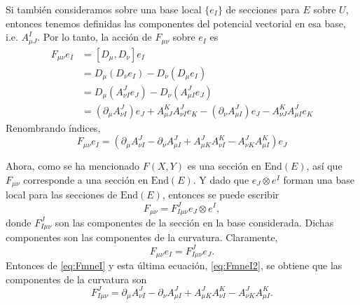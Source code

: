 Si tambi\'{e}n consideramos sobre una base local $\{e_{I}\}$ de secciones para $E$ sobre $U$, entonces tenemos definidas las componentes del potencial vectorial en esa base, i.e. $A^{I}_{\mu J}$. Por lo tanto, la acci\'{o}n de $F_{\mu \nu}$ sobre $e_{I}$ es
%
\begin{align*}
F_{\mu \nu} e_{I} & = [D_{\mu}, D_{\nu}] e_{I} \\
& = D_{\mu} (D_{\nu} e_{I}) - D_{\nu} (D_{\mu} e_{I}) \\
& = D_{\mu} (A^{J}_{\nu I} e_{J}) - D_{\nu} (A^{J}_{\mu I} e_{J}) \\
& = (\partial_{\mu} A^{J}_{\nu I}) e_{J} + A^{K}_{\mu J} A^{J}_{\nu I} e_{K} - (\partial_{\nu} A^{J}_{\mu I}) e_{J} - A^{K}_{\nu J} A^{J}_{\mu I} e_{K}
\end{align*}
%
Renombrando \'{i}ndices,
%
\begin{equation}
\label{eq:FmneI}
F_{\mu \nu} e_{I} = (\partial_{\mu} A^{J}_{\nu I} - \partial_{\nu} A^{J}_{\mu I} + A^{J}_{\mu K} A^{K}_{\nu I} - A^{J}_{\nu K} A^{K}_{\mu I}) e_{J}
\end{equation}

Ahora, como se ha mencionado $F(X,Y)$ es una secci\'{o}n en $\mathrm{End}(E)$, as\'{i} que $F_{\mu \nu}$ corresponde a una secci\'{o}n en $\mathrm{End}(E)$. Y dado que $e_{J} \otimes e^{I}$ forman una base local para las secciones de $\mathrm{End}(E)$, entonces se puede escribir
%
\begin{equation}
F_{\mu \nu} = F^{J}_{I \mu \nu} e_{J} \otimes e^{I},
\end{equation}
%
donde $F^{J}_{I \mu \nu}$ son las componentes de la secci\'{o}n en la base considerada. Dichas componentes son las componentes de la curvatura. Claramente,
%
\begin{equation}
\label{eq:FmneI2}
F_{\mu \nu} e_{I} = F^{J}_{I \mu \nu} e_{J}.
\end{equation}
%
Entonces de \eqref{eq:FmneI} y esta \'{u}ltima ecuaci\'{o}n, \eqref{eq:FmneI2}, se obtiene que las componentes de la curvatura son
%
\begin{equation}
F^{J}_{I \mu \nu} = \partial_{\mu} A^{J}_{\nu I} - \partial_{\nu} A^{J}_{\mu I} + A^{J}_{\mu K} A^{K}_{\nu I} - A^{J}_{\nu K} A^{K}_{\mu I}.
\end{equation}